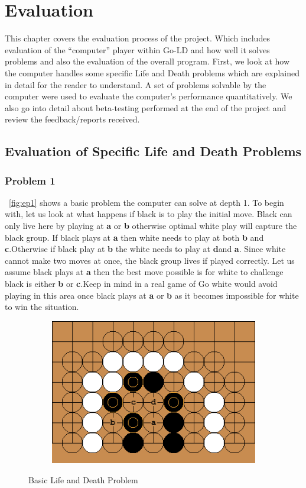 \documentclass{l4proj}
\newcommand{\bo}[1]{\textbf{#1}}
\begin{document}
\chapter{Evaluation}

This chapter covers the evaluation process of the project. Which includes evaluation of the “computer” player within Go-LD and how well it solves problems and also the evaluation of the overall program.  First, we look at how the computer handles some specific Life and Death problems which are explained in detail for the reader to understand. A set of problems solvable by the computer were used to evaluate the computer’s performance quantitatively. We also go into detail about beta-testing performed at the end of the project and review the feedback/reports received.

\section{Evaluation of Specific Life and Death Problems}
\subsection{Problem 1}
~\autoref{fig:ep1}  shows a basic problem the computer can solve at depth 1. To begin with, let us look at what happens if black is to play the initial move. Black can only live here by playing at \bo{a} or \bo{b} otherwise optimal white play will capture the black group. If black plays at \bo{a} then white needs to play at both \bo{b} and \bo{c}.Otherwise if black play at \bo{b} the white needs to play at \bo{d}and \bo{a}. Since white cannot make two moves at once, the black group lives if played correctly. Let us assume black plays at \bo{a} then the best move possible is for white to challenge black is either \bo{b} or \bo{c}.Keep in mind in a real game of Go white would avoid playing in this area once black plays at \bo{a} or \bo{b} as it becomes impossible for white to win the situation.
\begin{figure}[!ht]
\centering
\begin{subfigure}[b]{0.8\textwidth}
\includegraphics[width=\textwidth]{ep1/1.png}
\end{subfigure}
\caption{Basic Life and Death Problem}
\label{fig:ep1}
\end{figure}
\end{document}
